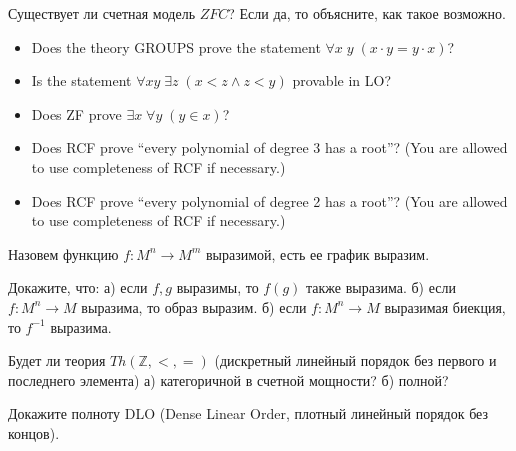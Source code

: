 \setcounter{curtask}{1}


\begin{task}
    Существует ли счетная модель $ZFC$? Если да, то объясните, как такое возможно.
\end{task}

\begin{task}
    \begin{itemize}
        \item Does the theory GROUPS prove the statement $\forall x\; y\;
        	(x\cdot y = y \cdot x)$?
        \item Is the statement $\forall xy\; \exists z\; (x<z \wedge z<y)$ provable
	    in LO?
    	\item Does ZF prove $\exists x \; \forall y\; (y\in x)$?
    	\item Does RCF prove ``every polynomial of degree 3 has a root''?
			(You are allowed to use completeness of RCF if necessary.)
		 \item Does RCF prove ``every polynomial of degree 2 has a root''? 
			 (You are allowed to use completeness of RCF if necessary.)
    \end{itemize}
\end{task}

Назовем функцию $f:M^{n} \to M^{m}$ выразимой, есть ее график выразим.

\begin{task}
	Докажите, что:
    а) если $f, g$ выразимы, то $f(g)$ также выразима.
    б) если $f:M^{n} \to M$ выразима, то образ выразим.
    б) если $f:M^{n} \to M$ выразимая биекция, то $f^{-1}$ выразима.
\end{task}

\begin{task}
    Будет ли теория $Th(\mathbb{Z}, <, =)$ (дискретный линейный порядок
    без первого и последнего элемента)
    а) категоричной в счетной мощности?
    б) полной?
\end{task}

\begin{task}
    Докажите полноту DLO (Dense Linear Order, плотный линейный порядок без концов).
\end{task}


